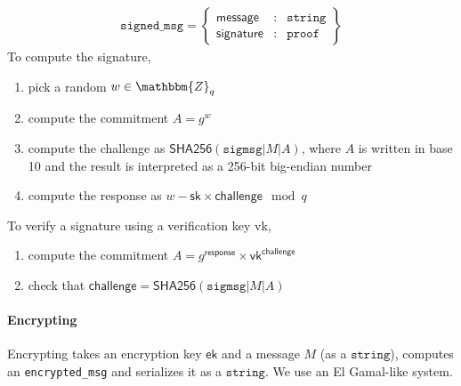 \documentclass[a4paper]{article}
\newcommand{\Z}{\mathbbm{Z}}
\newcommand{\jstring}{\texttt{string}}
\begin{document}
\begin{gather*}
  \texttt{signed\_msg}=\left\{
    \begin{array}{rcl}
      \textsf{message}&:&\jstring\\
      \textsf{signature}&:&\texttt{proof}
    \end{array}
  \right\}
\end{gather*}
To compute the \textsf{signature},
\begin{enumerate}
\item pick a random $w\in\Z_q$
\item compute the commitment $A=g^w$
\item compute the \textsf{challenge} as
  $\textsf{SHA256}(\texttt{sigmsg|}M\texttt{|}A)$, where $A$ is written
  in base 10 and the result is interpreted as a 256-bit big-endian
  number
\item compute the \textsf{response} as
  $w-\textsf{sk}\times\textsf{challenge}\mod q$
\end{enumerate}
To verify a \textsf{signature} using a verification key \textsf{vk},
\begin{enumerate}
\item compute the commitment $A=g^{\textsf{response}}\times\textsf{vk}^{\textsf{challenge}}$
\item check that $\textsf{challenge}=\textsf{SHA256}(\texttt{sigmsg|}M\texttt{|}A)$
\end{enumerate}

\paragraph{Encrypting}

Encrypting takes an encryption key $\textsf{ek}$ and a message $M$ (as
a $\jstring$), computes an \texttt{encrypted\_msg} and serializes it
as a $\jstring$. We use an El Gamal-like system.
\end{document}
